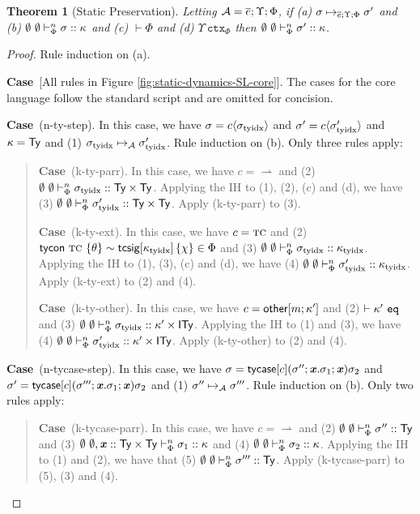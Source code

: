 \documentclass[12pt]{article}
\newtheorem{theorem}{Theorem}
\newcommand{\pfcase}[1]{\textbf{Case}~#1. }
\begin{document}
\begin{theorem}[Static Preservation]\label{thm:static-preservation}
Letting $\mathcal{A}=\overline{e};\Upsilon;\Phi$, if (a) $\sigma \mapsto_{\overline{e}; \Upsilon; \Phi} \sigma'$ and (b) $\emptyset~\emptyset \vdash_{\Phi}^{n} \sigma :: \kappa$ and (c) $\vdash \Phi$ and (d) $\Upsilon~\mathtt{ctx}_{\Phi}$ then $\emptyset~\emptyset \vdash_{\Phi}^{n} \sigma' :: \kappa$.
\end{theorem}
\begin{proof} Rule induction on (a).

\pfcase{[All rules in Figure \ref{fig:static-dynamics-SL-core}]} The cases for the core language follow the standard script and are omitted for concision.

\pfcase{(n-ty-step)} In this case, we have $\sigma={c}\langle\sigma_\text{tyidx}\rangle$ and $\sigma'={c}\langle\sigma_\text{tyidx}'\rangle$ and $\kappa={\sf Ty}$ and (1) $\sigma_\text{tyidx} \mapsto_{\mathcal{A}} \sigma_\text{tyidx}'$. Rule induction on (b). Only three rules apply:
\begin{quote}
    \pfcase{(k-ty-parr)} In this case, we have $c={\rightharpoonup}$ and (2) $\emptyset~\emptyset \vdash_{\Phi}^{n} \sigma_\text{tyidx} :: {\sf Ty}\times{\sf Ty}$. Applying the IH to (1), (2), (c) and (d), we have (3) $\emptyset~\emptyset \vdash_{\Phi}^{n} \sigma_\text{tyidx}' :: {\sf Ty}\times{\sf Ty}$. Apply (k-ty-parr) to (3).

    \pfcase{(k-ty-ext)} In this case, we have $c=\textsc{tc}$ and (2) ${\sf tycon}~\textsc{tc} ~\{\theta\} \sim {\sf tcsig}[\kappa_\text{tyidx}]\,\{\chi\} \in \Phi$ and (3) $\emptyset~\emptyset \vdash_{\Phi}^{n} \sigma_\text{tyidx} :: \kappa_\text{tyidx}$. Applying the IH to (1), (3), (c) and (d), we have (4) $\emptyset~\emptyset \vdash_{\Phi}^{n} \sigma_\text{tyidx}' :: \kappa_\text{tyidx}$. Apply (k-ty-ext) to (2) and (4).

    \pfcase{(k-ty-other)} In this case, we have $c={\sf other}[m; \kappa']$ and (2) $\vdash \kappa'~\mathtt{eq}$ and (3) $\emptyset~\emptyset \vdash_{\Phi}^{n} \sigma_\text{tyidx} :: \kappa'\times{\sf ITy}$. Applying the IH to (1) and (3), we have (4) $\emptyset~\emptyset \vdash_{\Phi}^{n} \sigma_\text{tyidx}' :: \kappa'\times{\sf ITy}$. Apply (k-ty-other) to (2) and (4).
\end{quote}

\pfcase{(n-tycase-step)} In this case, we have $\sigma={\sf tycase}[c](\sigma''; {\textbf{\textit{x}}}.\sigma_1; {\textbf{\textit{x}}}){\sigma_2}$ and $\sigma'={\sf tycase}[c](\sigma'''; {\textbf{\textit{x}}}.\sigma_1; {\textbf{\textit{x}}}){\sigma_2}$ and (1) $\sigma'' \mapsto_{\mathcal{A}} \sigma'''$. Rule induction on (b). Only two rules apply:
\begin{quote}
    \pfcase{(k-tycase-parr)} In this case, we have $c={\rightharpoonup}$ and (2) $\emptyset~\emptyset \vdash_{\Phi}^{n} \sigma'' :: {\sf Ty}$ and (3) $\emptyset~\emptyset, {\textbf{\textit{x}}} :: {\sf Ty}\times{\sf Ty} \vdash_{\Phi}^{n} \sigma_1 :: \kappa$ and (4) $\emptyset~\emptyset \vdash_{\Phi}^{n} \sigma_2 :: \kappa$. Applying the IH to (1) and (2), we have that (5) $\emptyset~\emptyset \vdash_{\Phi}^{n} \sigma''' :: {\sf Ty}$. Apply (k-tycase-parr) to (5), (3) and (4).


\end{quote}
\end{proof}
\end{document}
